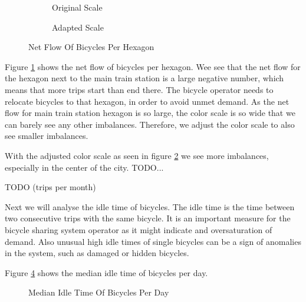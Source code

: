\begin{figure}[htb]
    \centering
    \begin{subfigure}[b]{0.45\textwidth}
        \caption{Original Scale}
        \label{fig:descriptive_analysis_net_flow_original}
    \end{subfigure}
    \begin{subfigure}[b]{0.45\textwidth}
        \caption{Adapted Scale}
        \label{fig:descriptive_analysis_net_flow_rescaled}
    \end{subfigure}
    \caption{Net Flow Of Bicycles Per Hexagon}
    \label{fig:descriptive_analysis_net_flow}
\end{figure}

Figure \ref{fig:descriptive_analysis_net_flow_original} shows the net flow of
bicycles per hexagon. Wee see that the net flow for the hexagon next to the
main train station is a large negative number, which means that more trips
start than end there. The bicycle operator needs to relocate bicycles to that
hexagon, in order to avoid unmet demand.
As the net flow for main train station hexagon is so large, the color scale is
so wide that we can barely see any other imbalances.
Therefore, we adjust the color scale to also see smaller imbalances.

With the adjusted color scale as seen in figure
\ref{fig:descriptive_analysis_net_flow_rescaled} we see more imbalances,
especially in the center of the city.
TODO...


TODO (trips per month)


Next we will analyse the idle time of bicycles. The idle time is the time
between two consecutive trips with the same bicycle. It is an important measure
for the bicycle sharing system operator as it might indicate and oversaturation
of demand. Also unusual high idle times of single bicycles can be a sign of
anomalies in the system, such as damaged or hidden bicycles.


Figure \ref{fig:descriptive_analysis_idle_time_daily} shows the median idle time of bicycles per day.
\begin{figure}[htb]
    \centering
    \caption{Median Idle Time Of Bicycles Per Day}
    \label{fig:descriptive_analysis_idle_time_daily}
\end{figure}

